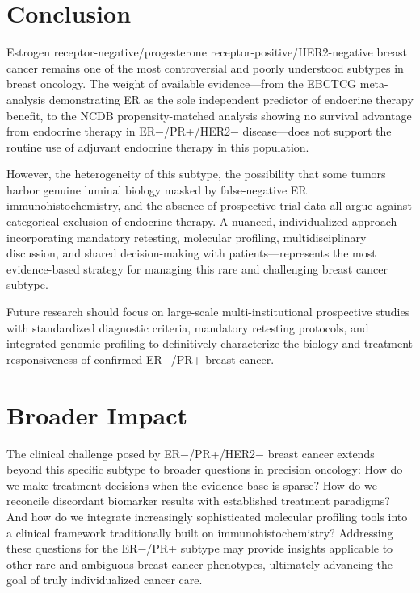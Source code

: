 \documentclass{article}
\begin{document}
\section{Conclusion}

Estrogen receptor-negative/progesterone receptor-positive/HER2-negative breast cancer remains one of the most controversial and poorly understood subtypes in breast oncology. The weight of available evidence—from the EBCTCG meta-analysis demonstrating ER as the sole independent predictor of endocrine therapy benefit, to the NCDB propensity-matched analysis showing no survival advantage from endocrine therapy in ER−/PR+/HER2− disease—does not support the routine use of adjuvant endocrine therapy in this population.

However, the heterogeneity of this subtype, the possibility that some tumors harbor genuine luminal biology masked by false-negative ER immunohistochemistry, and the absence of prospective trial data all argue against categorical exclusion of endocrine therapy. A nuanced, individualized approach—incorporating mandatory retesting, molecular profiling, multidisciplinary discussion, and shared decision-making with patients—represents the most evidence-based strategy for managing this rare and challenging breast cancer subtype.

Future research should focus on large-scale multi-institutional prospective studies with standardized diagnostic criteria, mandatory retesting protocols, and integrated genomic profiling to definitively characterize the biology and treatment responsiveness of confirmed ER−/PR+ breast cancer.

\section{Broader Impact}

The clinical challenge posed by ER−/PR+/HER2− breast cancer extends beyond this specific subtype to broader questions in precision oncology: How do we make treatment decisions when the evidence base is sparse? How do we reconcile discordant biomarker results with established treatment paradigms? And how do we integrate increasingly sophisticated molecular profiling tools into a clinical framework traditionally built on immunohistochemistry? Addressing these questions for the ER−/PR+ subtype may provide insights applicable to other rare and ambiguous breast cancer phenotypes, ultimately advancing the goal of truly individualized cancer care.




\end{document}
